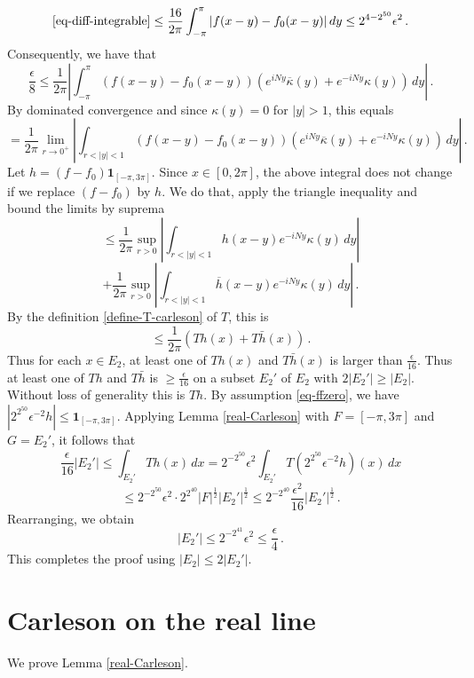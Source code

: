 {$$
    \eqref{eq-diff-integrable} \le \frac{16}{2\pi} \int_{-\pi}^{\pi} |f(x-y) - f_0(x-y)| \, dy \le 2^{4-2^{50}} \epsilon^2\,.
$$
Consequently, we have that
$$
    \frac{\epsilon}{8} \le \frac{1}{2\pi} \left| \int_{-\pi}^{\pi} (f(x-y) - f_0(x-y)) (e^{iNy} \overline{\kappa}(y) + e^{-iNy}\kappa(y)) \, dy\right|\,.
$$
By dominated convergence and since $\kappa(y) = 0$ for $|y| > 1$, this equals
$$
     = \frac{1}{2\pi} \lim_{r \to 0^+} \left| \int_{r < |y| < 1} (f(x-y) - f_0(x-y)) (e^{iNy} \overline{\kappa}(y) + e^{-iNy}\kappa(y)) \, dy\right|\,.
$$
Let $h = (f - f_0) \mathbf{1}_{[-\pi, 3\pi]}$. Since $x \in [0, 2\pi]$, the above integral does not change if we replace $(f - f_0)$ by $h$. We do that, apply the triangle inequality and bound the limits by suprema
$$
    \le \frac{1}{2\pi} \sup_{r > 0} \left| \int_{r < |y| < 1} h(x-y) e^{-iNy} \kappa(y) \, dy\right|
$$
$$
    + \frac{1}{2\pi} \sup_{r > 0} \left| \int_{r < |y| < 1} \overline{h}(x-y) e^{-iNy} \kappa(y) \, dy\right|\,.
$$
By the definition \eqref{define-T-carleson} of $T$, this is
$$
    \le \frac{1}{2\pi} (Th(x) + T\bar{h}(x))\,.
$$
Thus for each $x \in E_2$, at least one of $Th(x)$ and $T\bar h(x)$ is larger than $\frac{\epsilon}{16}$.
Thus at least one of $Th$ and $T\bar h$ is $\ge \frac{\epsilon}{16}$ on a subset $E_2'$ of $E_2$ with $2|E_2'| \ge |E_2|$. Without loss of generality this is $Th$. By assumption \eqref{eq-ffzero}, we have $|2^{2^{50}}\epsilon^{-2} h| \le \mathbf{1}_{[-\pi, 3\pi]}$. Applying Lemma \ref{real-Carleson} with $F = [-\pi, 3\pi]$ and $G = E_2'$, it follows that
$$
    \frac{\epsilon}{16} |E_2'| \le \int_{E_2'} Th(x) \, dx = 2^{-2^{50}}\epsilon^2 \int_{E_2'} T(2^{2^{50}}\epsilon^{-2} h)(x) \, dx
$$
$$
    \le 2^{-2^{50}}  \epsilon^2 \cdot 2^{2^{40}}  |F|^{\frac{1}{2}} |E_2'|^{\frac{1}{2}} \le  2^{-2^{40}} \frac{\epsilon^2}{16} |E_2'|^{\frac{1}{2}}\,.
$$
Rearranging, we obtain
$$
    |E_2'| \le 2^{-2^{41}}\epsilon^2 \le \frac{\epsilon}{4}\,.
$$
This completes the proof using $|E_2| \le 2|E_2'|$.





\section{Carleson on the real line}
\label{10carleson}

We prove Lemma \ref{real-Carleson}.

}
